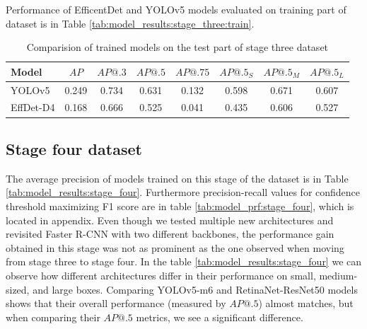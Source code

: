 Performance of EfficentDet and YOLOv5 models evaluated on training part of dataset is in Table \ref{tab:model_results:stage_three:train}.

\begin{table}[H]
    \centering
    \begin{tabular}{|l|c|c|c|c|c|c|c|}
        \hline
        Model     & $AP$  & $AP@.3$ & $AP@.5$ & $AP@.75$ & $AP@.5_S$ & $AP@.5_M$ & $AP@.5_L$ \\ \hline
        YOLOv5    & 0.249 & 0.734   & 0.631   & 0.132    & 0.598     & 0.671     & 0.607     \\ \hline
        EffDet-D4 & 0.168 & 0.666   & 0.525   & 0.041    & 0.435     & 0.606     & 0.527     \\ \hline
    \end{tabular}
    \caption{Comparision of trained models on the test part of stage three dataset}
    \label{tab:model_results:stage_three:test}
\end{table}

\subsection{Stage four dataset}
The average precision of models trained on this stage of the dataset is in Table \ref{tab:model_results:stage_four}. Furthermore precision-recall values for confidence threshold maximizing F1 score are in table \ref{tab:model_prf:stage_four}, which is located in appendix. Even though we tested multiple new architectures and revisited Faster R-CNN with two different backbones, the performance gain obtained in this stage was not as prominent as the one observed when moving from stage three to stage four.
In the table \ref{tab:model_results:stage_four} we can observe how different architectures differ in their performance on small, medium-sized, and large boxes. Comparing YOLOv5-m6 and RetinaNet-ResNet50 models shows that their overall performance (measured by $AP@.5$) almost matches, but when comparing their $AP@.5$ metrics, we see a significant difference.

